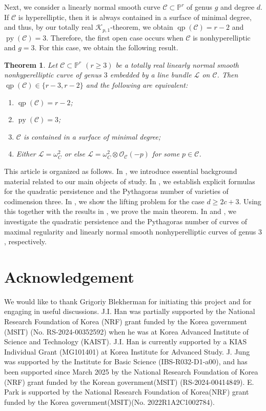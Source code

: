 \documentclass[11pt,letterpaper,reqno]{amsart}
\theoremstyle{plain}
\newtheorem{theorem}{Theorem}[section]
\theoremstyle{definition}
\newtheorem{open problem}[theorem]{Open Problem}
\newtheorem{remark and notation}[theorem]{Remark and Notation}
\newtheorem{remark and definition}[theorem]{Remark and Definition}
\newtheorem{definition and notation}[theorem]{Definition and Notation}
\newtheorem{notation and convention}[theorem]{Notation and Convention}
\newtheorem{notation and remark}[theorem]{Notation and Remark}
\newtheorem{convention and notation}[theorem]{Convention and Notation}
\def \p {\mathbb{P}}
\def \py {\operatorname{py}}
\def \qp {\operatorname{qp}}
\begin{document}
Next, we consider a linearly normal smooth curve $\mathcal{C} \subset \p^r$ of genus $g$ and degree $d$. If $\mathcal{C}$ is hyperelliptic, then it is always contained in a surface of minimal degree, and thus, by our totally real $\mathcal{K}_{p,1}$-theorem, we obtain 
$\qp(\mathcal{C}) = r - 2$ and $\py(\mathcal{C}) = 3$. Therefore, the first open case occurs when $\mathcal{C}$ is nonhyperelliptic and $g=3$. For this case, we obtain the following result.
\begin{theorem}\label{thm:nonhyperelliptic curve of genus 3}
Let $\mathcal{C}\subset \p^{r}$ $(r\geq 3)$ be a totally real linearly normal smooth nonhyperelliptic curve of genus $3$ embedded by a line bundle $\mathcal{L}$ on $\mathcal{C}$.
Then $\qp (\mathcal{C}) \in \{r-3,r-2\}$ and the following are equivalent:
\begin{enumerate}[\rm (i)]
    \item $\qp (\mathcal{C}) = r - 2$;
    \item $\py(\mathcal{C})=3$;
    \item $\mathcal{C}$ is contained in a surface of minimal degree;
    \item Either $\mathcal{L} = \omega_{C} ^2$  or else $\mathcal{L} = \omega_{C} ^{2} \otimes \mathcal{O}_{\mathcal{C}}(-p)$ for some $p \in \mathcal{C}$.
\end{enumerate}
\end{theorem}

This article is organized as follows.  
In , we introduce essential background material related to our main objects of study.
In , we establish explicit formulas for the quadratic persistence and the Pythagoras number of varieties of codimension three.
In , we show the lifting problem for the case $d\geq 2c+3$. Using this together with the results in , we prove the main theorem.
In  and , we investigate the quadratic persistence and the Pythagoras number of curves of maximal regularity and linearly normal smooth nonhyperelliptic curves of genus $3$, respectively.

\bigskip

\section*{Acknowledgement}
We would like to thank Grigoriy Blekherman for initiating this project and for engaging in useful discussions.
J.I. Han was partially supported by the National Research Foundation of Korea (NRF) grant funded by the Korea government (MSIT) (No. RS-2024-00352592) when he was at Korea Advanced Institute of Science and Technology (KAIST). J.I. Han is currently supported by a KIAS Individual Grant (MG101401) at Korea Institute for Advanced Study.
J. Jung was supported by the Institute for Basic Science (IBS-R032-D1-a00), and has been supported since March 2025 by the National Research Foundation of Korea (NRF) grant funded by the Korean government(MSIT) (RS-2024-00414849).
E. Park is supported by the National Research Foundation of Korea(NRF) grant funded by the Korea government(MSIT)(No. 2022R1A2C1002784). 
\end{document}
